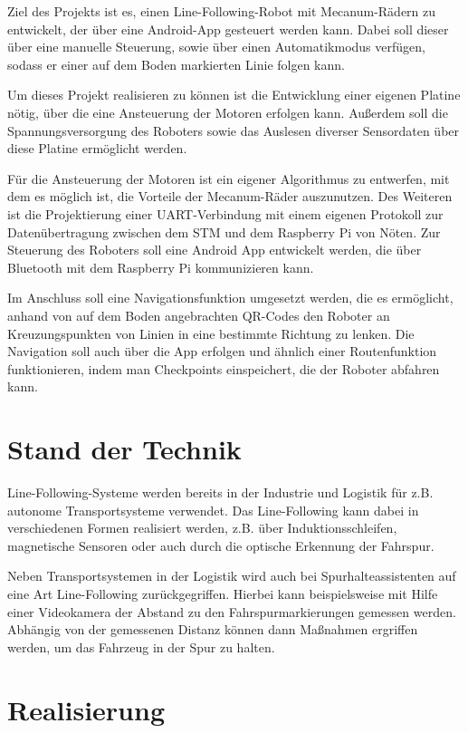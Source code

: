 \documentclass[12pt, a4paper]{report}
\begin{document}
Ziel des Projekts ist es, einen Line-Following-Robot mit Mecanum-Rädern zu entwickelt, der über eine Android-App gesteuert werden kann. Dabei soll dieser über eine manuelle Steuerung, sowie über einen Automatikmodus verfügen, sodass er einer auf dem Boden markierten Linie folgen kann.

Um dieses Projekt realisieren zu können ist die Entwicklung einer eigenen Platine nötig, über die eine Ansteuerung der Motoren erfolgen kann. Außerdem soll die Spannungsversorgung des Roboters sowie das Auslesen diverser Sensordaten über diese Platine ermöglicht werden.

Für die Ansteuerung der Motoren ist ein eigener Algorithmus zu entwerfen, mit dem es möglich ist, die Vorteile der Mecanum-Räder auszunutzen. Des Weiteren ist die Projektierung einer UART-Verbindung mit einem eigenen Protokoll zur Datenübertragung zwischen dem STM und dem Raspberry Pi von Nöten. Zur Steuerung des Roboters soll eine Android App entwickelt werden, die über Bluetooth mit dem Raspberry Pi kommunizieren kann.

Im Anschluss soll eine Navigationsfunktion umgesetzt werden, die es ermöglicht, anhand von auf dem Boden angebrachten QR-Codes den Roboter an Kreuzungspunkten von Linien in eine bestimmte Richtung zu lenken. Die Navigation soll auch über die App erfolgen und ähnlich einer Routenfunktion funktionieren, indem man Checkpoints einspeichert, die der Roboter abfahren kann.


\chapter{Stand der Technik}\label{sec:StandDerTechnik}

Line-Following-Systeme werden bereits in der Industrie und Logistik für z.B. autonome Transportsysteme verwendet. Das Line-Following kann dabei in verschiedenen Formen realisiert werden, z.B. über Induktionsschleifen, magnetische Sensoren oder auch durch die optische Erkennung der Fahrspur.\cite{schilling, schaefer}

Neben Transportsystemen in der Logistik wird auch bei Spurhalteassistenten auf eine Art Line-Following zurückgegriffen. Hierbei kann beispielsweise mit Hilfe einer Videokamera der Abstand zu den Fahrspurmarkierungen gemessen werden. Abhängig von der gemessenen Distanz können dann Maßnahmen ergriffen werden, um das Fahrzeug in der Spur zu halten.\cite{bosch}


\chapter{Realisierung}\label{sec:Realisierung}
\end{document}
